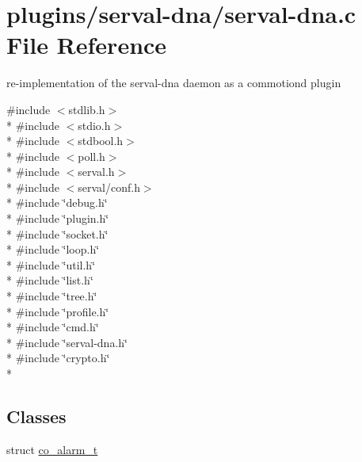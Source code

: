 \hypertarget{serval-dna_8c}{\section{plugins/serval-\/dna/serval-\/dna.c File Reference}
\label{serval-dna_8c}
}


re-\/implementation of the serval-\/dna daemon as a commotiond plugin  


{\ttfamily \#include $<$stdlib.\+h$>$}\\*
{\ttfamily \#include $<$stdio.\+h$>$}\\*
{\ttfamily \#include $<$stdbool.\+h$>$}\\*
{\ttfamily \#include $<$poll.\+h$>$}\\*
{\ttfamily \#include $<$serval.\+h$>$}\\*
{\ttfamily \#include $<$serval/conf.\+h$>$}\\*
{\ttfamily \#include \char`\"{}debug.\+h\char`\"{}}\\*
{\ttfamily \#include \char`\"{}plugin.\+h\char`\"{}}\\*
{\ttfamily \#include \char`\"{}socket.\+h\char`\"{}}\\*
{\ttfamily \#include \char`\"{}loop.\+h\char`\"{}}\\*
{\ttfamily \#include \char`\"{}util.\+h\char`\"{}}\\*
{\ttfamily \#include \char`\"{}list.\+h\char`\"{}}\\*
{\ttfamily \#include \char`\"{}tree.\+h\char`\"{}}\\*
{\ttfamily \#include \char`\"{}profile.\+h\char`\"{}}\\*
{\ttfamily \#include \char`\"{}cmd.\+h\char`\"{}}\\*
{\ttfamily \#include \char`\"{}serval-\/dna.\+h\char`\"{}}\\*
{\ttfamily \#include \char`\"{}crypto.\+h\char`\"{}}\\*
\subsection*{Classes}
\begin{DoxyCompactItemize}
\item 
struct \hyperlink{structco__alarm__t}{co\+\_\+alarm\+\_\+t}
\end{DoxyCompactItemize}
